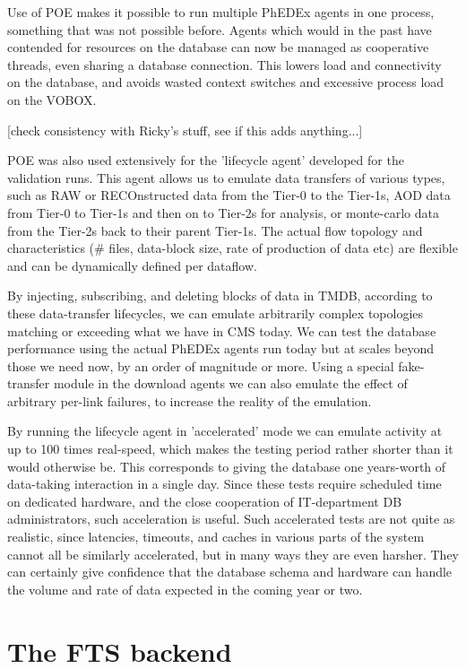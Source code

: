 \documentclass{PoS}
\begin{document}
Use of POE makes it possible to run multiple PhEDEx agents in one
process, something that was not possible before. Agents which would in
the past have contended for resources on the database can now be
managed as cooperative threads, even sharing a database
connection. This lowers load and connectivity on the database, and
avoids wasted context switches and excessive process load on the
VOBOX.

[check consistency with Ricky's stuff, see if this adds anything...]

POE was also used extensively for the 'lifecycle agent' developed for
the validation runs. This agent allows us to emulate data transfers of
various types, such as RAW or RECOnstructed data from the Tier-0 to
the Tier-1s, AOD data from Tier-0 to Tier-1s and then on to Tier-2s
for analysis, or monte-carlo data from the Tier-2s back to their
parent Tier-1s. The actual flow topology and characteristics (\# files,
data-block size, rate of production of data etc) are flexible and can
be dynamically defined per dataflow.

By injecting, subscribing, and deleting blocks of data in TMDB,
according to these data-transfer lifecycles, we can emulate
arbitrarily complex topologies matching or exceeding what we have in
CMS today. We can test the database performance using the actual
PhEDEx agents run today but at scales beyond those we need now, by an
order of magnitude or more.  Using a special fake-transfer module in
the download agents we can also emulate the effect of arbitrary
per-link failures, to increase the reality of the emulation.

By running the lifecycle agent in 'accelerated' mode we can emulate
activity at up to 100 times real-speed, which makes the testing period
rather shorter than it would otherwise be. This corresponds to giving
the database one years-worth of data-taking interaction in a single
day. Since these tests require scheduled time on dedicated hardware,
and the close cooperation of IT-department DB administrators, such
acceleration is useful. Such accelerated tests are not quite as
realistic, since latencies, timeouts, and caches in various parts of
the system cannot all be similarly accelerated, but in many ways they
are even harsher. They can certainly give confidence that the database
schema and hardware can handle the volume and rate of data expected in
the coming year or two.

\section{The FTS backend}
\end{document}
